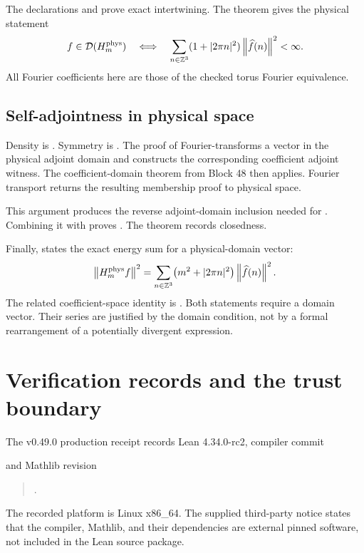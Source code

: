 The declarations  and  prove exact intertwining. The theorem  gives the physical statement
\[
 f\in\mathcal D(H_m^{\mathrm{phys}})
 \quad\Longleftrightarrow\quad
 \sum_{n\in\mathbb Z^3}(1+|2\pi n|^2)\left\lVert\widehat f(n)\right\rVert^2<\infty.
\]
All Fourier coefficients here are those of the checked torus Fourier equivalence.

\subsection{Self-adjointness in physical space}

Density is . Symmetry is . The proof of  Fourier-transforms a vector in the physical adjoint domain and constructs the corresponding coefficient adjoint witness. The coefficient-domain theorem from Block 48 then applies. Fourier transport returns the resulting membership proof to physical space.

This argument produces the reverse adjoint-domain inclusion needed for . Combining it with  proves . The theorem  records closedness.

Finally,  states the exact energy sum for a physical-domain vector:
\[
 \left\lVert H_m^{\mathrm{phys}}f\right\rVert^2
 =\sum_{n\in\mathbb Z^3}\bigl(m^2+|2\pi n|^2\bigr)
       \left\lVert\widehat f(n)\right\rVert^2.
\]
The related coefficient-space identity is . Both statements require a domain vector. Their series are justified by the domain condition, not by a formal rearrangement of a potentially divergent expression.

\section{Verification records and the trust boundary}

The v0.49.0 production receipt records Lean 4.34.0-rc2, compiler commit
\begin{quote}\small{}\end{quote}
and Mathlib revision
\begin{quote}\small{}.\end{quote}
The recorded platform is Linux x86\_64. The supplied third-party notice states that the compiler, Mathlib, and their dependencies are external pinned software, not included in the Lean source package.

